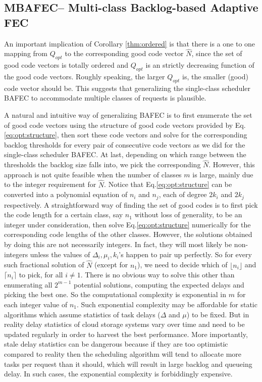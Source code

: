 \documentclass[journal]{IEEEtran}
\newcommand{\nonBlocking}{{BAFEC}\xspace}
\newcommand{\multiclass}{{MBAFEC}\xspace}
\newcommand{\codeVec}{\hat{N}}
\begin{document}
\subsection{\multiclass -- Multi-class Backlog-based Adaptive FEC}
\label{ssec:multi:algorithm}

An important implication of Corollary \ref{thm:ordered} is that there is a one to one mapping from $Q_{opt}$ to the corresponding good code vector $\codeVec$, since the set of good code vectors is totally ordered and $Q_{opt}$ is an strictly decreasing function of the good code vectors. Roughly speaking, the larger $Q_{opt}$ is, the smaller (good) code vector should be. This suggests that generalizing the single-class scheduler \nonBlocking to accommodate multiple classes of requests is plausible. 

A natural and intuitive way of generalizing \nonBlocking is to first enumerate the set of good code vectors using the structure of good code vectors provided by Eq.\ref{eq:opt:structure}, then sort these code vectors and solve for the corresponding backlog thresholds for every pair of consecutive code vectors as we did for the single-class scheduler \nonBlocking. At last, depending on which range between the thresholds the backlog size falls into, we pick the corresponding $\codeVec$.  However, this approach is not quite feasible when the number of classes $m$ is large, mainly due to the integer requirement for $\codeVec$. Notice that Eq.\ref{eq:opt:structure} can be converted into a polynomial equation of $n_i$ and $n_j$, each of degree $2k_i$ and $2k_j$ respectively. A straightforward way of finding the set of good codes is to first pick the code length for a certain class, say $n_1$ without loss of generality, to be an integer under consideration, then solve Eq.\ref{eq:opt:structure} numerically for the corresponding code lengths of the other classes. However, the solutions obtained by doing this are not necessarily integers. In fact, they will most likely be non-integers unless the values of $\Delta_i,\mu_i,k_i$'s happen to pair up perfectly. So for every such fractional solution of $\codeVec$ (except for $n_1$), we need to decide which of $\lfloor n_i \rfloor$ and $\lceil n_i \rceil$ to pick, for all $i\neq 1$. There is no obvious way to solve this other than enumerating all $2^{m-1}$ potential solutions, computing the expected delays and picking the best one. So the computational complexity is exponential in $m$ for each integer value of $n_1$. Such exponential complexity may be affordable for static algorithms which assume statistics of task delays ($\Delta$ and $\mu$) to be fixed. But in reality delay statistics of cloud storage systems vary over time and need to be updated regularly in order to harvest the best performance. More importantly, stale delay statistics can be dangerous because if they are too optimistic compared to reality then the scheduling algorithm will tend to allocate more tasks per request than it  should, which will result in large backlog and queueing delay. In such cases, the exponential complexity is forbiddingly expensive. 
\end{document}
